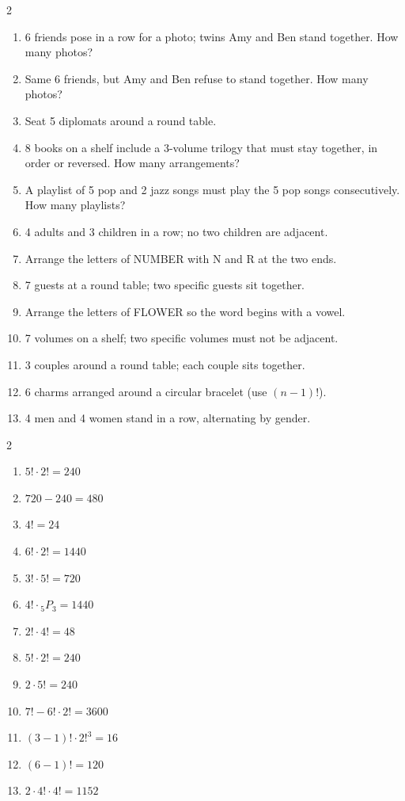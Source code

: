\documentclass[11pt]{article}
\begin{document}
\clearpage
{}

\begin{recapbox}
\begin{multicols}{2}
\small
\begin{enumerate}[leftmargin=*,itemsep=3pt]
  \item 6 friends pose in a row for a photo; twins Amy and Ben stand together. How many photos?
  \item Same 6 friends, but Amy and Ben refuse to stand together. How many photos?
  \item Seat 5 diplomats around a round table.
  \item 8 books on a shelf include a 3-volume trilogy that must stay together, in order or reversed. How many arrangements?
  \item A playlist of 5 pop and 2 jazz songs must play the 5 pop songs consecutively. How many playlists?
  \item 4 adults and 3 children in a row; no two children are adjacent.
  \item Arrange the letters of NUMBER with N and R at the two ends.
  \item 7 guests at a round table; two specific guests sit together.
  \item Arrange the letters of FLOWER so the word begins with a vowel.
  \item 7 volumes on a shelf; two specific volumes must not be adjacent.
  \item 3 couples around a round table; each couple sits together.
  \item 6 charms arranged around a circular bracelet (use $(n-1)!$).
  \item 4 men and 4 women stand in a row, alternating by gender.
\end{enumerate}
\end{multicols}
\end{recapbox}

\begin{keybox}
\begin{multicols}{2}
\small
\begin{enumerate}[leftmargin=*,itemsep=3pt]
  \item $5!\cdot2!=240$
  \item $720-240=480$
  \item $4!=24$
  \item $6!\cdot2!=1440$
  \item $3!\cdot5!=720$
  \item $4!\cdot{}_5P_3=1440$
  \item $2!\cdot4!=48$
  \item $5!\cdot2!=240$
  \item $2\cdot5!=240$
  \item $7!-6!\cdot2!=3600$
  \item $(3-1)!\cdot2!^3=16$
  \item $(6-1)!=120$
  \item $2\cdot4!\cdot4!=1152$
\end{enumerate}
\end{multicols}
\end{keybox}
\end{document}
